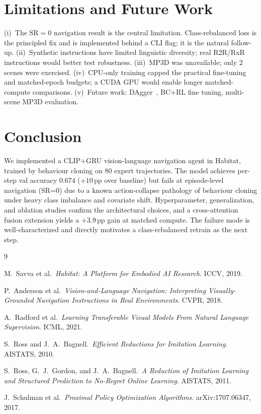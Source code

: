 \documentclass[10pt, twocolumn]{article}
\begin{document}
\section{Limitations and Future Work}\label{sec:limitations}

(i)~The $\mathrm{SR}=0$ navigation result is the central limitation.
Class-rebalanced loss is the principled fix and is implemented behind a
CLI flag; it is the natural follow-up. (ii)~Synthetic instructions
have limited linguistic diversity; real R2R/RxR instructions would
better test robustness. (iii)~MP3D was unavailable; only $2$ scenes were
exercised. (iv)~CPU-only training capped the practical fine-tuning and
matched-epoch budgets; a CUDA GPU would enable longer matched-compute
comparisons. (v)~Future work: DAgger~\cite{ross2011dagger}, BC$+$RL fine
tuning, multi-scene MP3D evaluation.

\section{Conclusion}

We implemented a CLIP+GRU vision-language navigation agent in Habitat,
trained by behaviour cloning on $80$ expert trajectories. The model
achieves per-step val accuracy $0.674$ ($+10$\,pp over baseline) but
fails at episode-level navigation (SR=$0$) due to a known action-collapse
pathology of behaviour cloning under heavy class imbalance and
covariate shift. Hyperparameter, generalization, and ablation studies
confirm the architectural choices, and a cross-attention fusion
extension yields a $+3.9$\,pp gain at matched compute. The failure mode
is well-characterized and directly motivates a class-rebalanced retrain
as the next step.


\begin{thebibliography}{9}\small\setlength{\itemsep}{0pt}

M.~Savva et al.\
\textit{Habitat: A Platform for Embodied AI Research}.
ICCV, 2019.

P.~Anderson et al.\
\textit{Vision-and-Language Navigation: Interpreting Visually-Grounded
Navigation Instructions in Real Environments}.
CVPR, 2018.

A.~Radford et al.\
\textit{Learning Transferable Visual Models From Natural Language
Supervision}.
ICML, 2021.

S.~Ross and J.~A.~Bagnell.\
\textit{Efficient Reductions for Imitation Learning}.
AISTATS, 2010.

\bibitem{ross2011dagger}
S.~Ross, G.~J.~Gordon, and J.~A.~Bagnell.\
\textit{A Reduction of Imitation Learning and Structured Prediction to
No-Regret Online Learning}.
AISTATS, 2011.

\bibitem{schulman2017ppo}
J.~Schulman et al.\
\textit{Proximal Policy Optimization Algorithms}.
arXiv:1707.06347, 2017.

\end{thebibliography}
\end{document}
